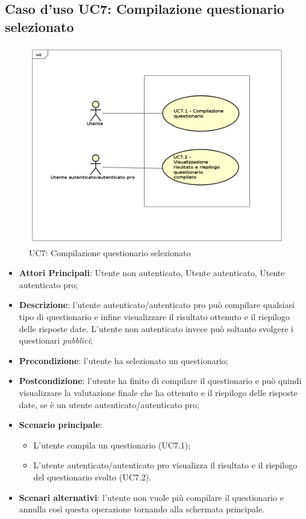 \newpage
\subsection{Caso d'uso UC7: Compilazione questionario selezionato}
\label{UC7}
\begin{figure}[h]
\centering
\includegraphics[scale=0.5,keepaspectratio]{UML/UC7.png}
\caption{UC7: Compilazione questionario selezionato}
\end{figure}
\FloatBarrier
\begin{itemize}
\item\textbf{Attori Principali}: Utente non autenticato, Utente autenticato, Utente autenticato pro;
\item\textbf{Descrizione}: l'utente autenticato/autenticato pro può compilare qualsiasi tipo di questionario e infine visualizzare il risultato ottenuto e il riepilogo delle risposte date. L'utente non autenticato invece può soltanto svolgere i questionari \textit{pubblici};
\item\textbf{Precondizione}: l'utente ha selezionato un questionario;
\item\textbf{Postcondizione}: l'utente ha finito di compilare il questionario e può quindi visualizzare la valutazione finale che ha ottenuto e il riepilogo delle risposte date, se è un utente autenticato/autenticato pro;
\item\textbf{Scenario principale}:
\begin{itemize}
\item L'utente compila un questionario (UC7.1);
\item L'utente autenticato/autenticato pro visualizza il risultato e il riepilogo del questionario svolto (UC7.2).
\end{itemize}
\item\textbf{Scenari alternativi}: l'utente non vuole più compilare il questionario e annulla così questa operazione tornando alla schermata principale.
\end{itemize}

